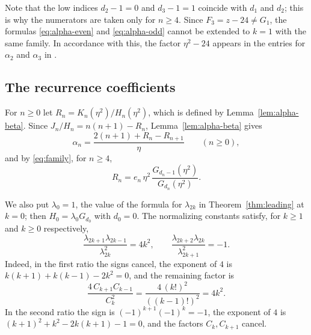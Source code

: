 \documentclass[11pt]{amsart}
\theoremstyle{remark}
\numberwithin{equation}{section}
\begin{document}
Note that the low indices $d_2-1=0$ and $d_3-1=1$ coincide with $d_1$ and $d_2$; this is why the numerators are taken only for $n\ge4$. Since $F_3=z-24\ne G_1$, the formulas \eqref{eq:alpha-even} and \eqref{eq:alpha-odd} cannot be extended to $k=1$ with the same family. In accordance with this, the factor $\eta^2-24$ appears in the entries for $\alpha_2$ and $\alpha_3$ in \cite[Table~4]{LZ}.

\subsection{The recurrence coefficients}
For $n\ge0$ let $R_n=K_n(\eta^2)/H_n(\eta^2)$, which is defined by Lemma~\ref{lem:alpha-beta}. Since $J_n/H_n=n(n+1)-R_n$, Lemma~\ref{lem:alpha-beta} gives
\begin{equation}\label{eq:alpha-R}
\alpha_n=\frac{2(n+1)+R_n-R_{n+1}}{\eta}\qquad(n\ge0),
\end{equation}
and by \eqref{eq:family}, for $n\ge4$,
\begin{equation}\label{eq:R}
R_n=e_n\,\eta^2\,\frac{G_{d_n-1}(\eta^2)}{G_{d_n}(\eta^2)}.
\end{equation}

We also put $\lambda_0=1$, the value of the formula for $\lambda_{2k}$ in Theorem~\ref{thm:leading} at $k=0$; then $H_0=\lambda_0G_{d_0}$ with $d_0=0$. The normalizing constants satisfy, for $k\ge1$ and $k\ge0$ respectively,
\begin{equation}\label{eq:ratios}
\frac{\lambda_{2k+1}\lambda_{2k-1}}{\lambda_{2k}^2}=4k^2,\qquad
\frac{\lambda_{2k+2}\lambda_{2k}}{\lambda_{2k+1}^2}=-1.
\end{equation}
Indeed, in the first ratio the signs cancel, the exponent of $4$ is $k(k+1)+k(k-1)-2k^2=0$, and the remaining factor is
\[
\frac{4\,C_{k+1}C_{k-1}}{C_k^2}=\frac{4\,(k!)^2}{((k-1)!)^2}=4k^2 .
\]
In the second ratio the sign is $(-1)^{k+1}(-1)^k=-1$, the exponent of $4$ is $(k+1)^2+k^2-2k(k+1)-1=0$, and the factors $C_k,C_{k+1}$ cancel.
\end{document}
